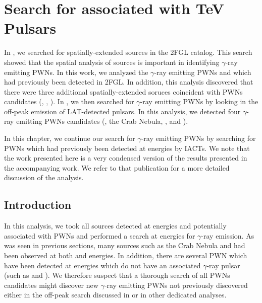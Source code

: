 \chapter{Search for  associated with TeV Pulsars}


In , we searched for spatially-extended sources
in the 2FGL catalog.  This search showed that the spatial analysis of
\fermi sources is important in identifying $\gamma$-ray emitting \acp{PWN}.
In this work, we analyzed the $\gamma$-ray emitting \acp{PWN} 
and \mshfifteenfiftytwo which had previously been detected in \ac{2FGL}.
In addition, this analysis discovered that there were three additional
spatially-extended \fermi soruces coincident with \acp{PWN} candidates
(, , ).
In , we then searched for $\gamma$-ray emitting \acp{PWN}
by looking in the off-peak emission of \ac{LAT}-detected
pulsars. In this analysis, we detected four $\gamma$-ray emitting \acp{PWN}
candidates (\velax, the Crab Nebula, \mshfifteenfiftytwo, and \threecfiftyeight).

In this chapter, we continue our search for $\gamma$-ray emitting
\acp{PWN} by searching for \acp{PWN} which had previously been detected
at \tev energies by \acp{IACT}. We note that the work presented here is
a very condensed version of the results presented in the accompanying work.
We refer to that publication for a more detailed discussion of
the analysis.

\section{Introduction}

In this analysis, we took all sources detected at \tev energies and
potentially associated with \acp{PWN} and performed a search at \gev
energies for $\gamma$-ray emission. As was seen in previous sections,
many sources such as the Crab Nebula and \velax had been observed at
both \gev and \tev energies. In addition, there are several \ac{PWN}
which have been detected at \tev energies which do not have an associated
$\gamma$-ray pulsar (such as  and ).  We therefore
suspect that a thorough search of all \tev \acp{PWN} candidates might
discover new $\gamma$-ray emitting \acp{PWN} not previously discovered
either in the off-peak search discussed in  or in other
dedicated analyses.

